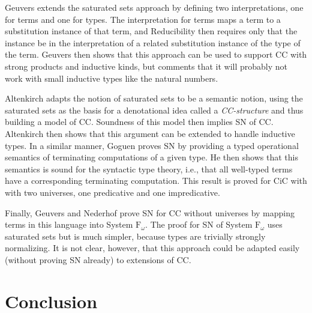 \documentclass{article}
\begin{document}
Geuvers \cite{geuvers94} extends the saturated sets approach by
defining two interpretations, one for terms and one for types.  The
interpretation for terms maps a term to a substitution instance of
that term, and Reducibility then requires only that the instance be in
the interpretation of a related substitution instance of the type of
the term. Geuvers then shows that this approach can be used to support
CC with strong products and inductive kinds, but comments that it will
probably not work with small inductive types like the natural numbers.

Altenkirch \cite{altenkirch93} adapts the notion of saturated sets to
be a semantic notion, using the saturated sets as the basis for a
denotational idea called a \emph{CC-structure} and thus building a
model of CC. Soundness of this model then implies SN of CC. Altenkirch
then shows that this argument can be extended to handle inductive
types.  In a similar manner, Goguen \cite{goguen94} proves SN by
providing a typed operational semantics of terminating computations of
a given type. He then shows that this semantics is sound for the
syntactic type theory, i.e., that all well-typed terms have a
corresponding terminating computation. This result is proved for CiC
with with two universes, one predicative and one impredicative.

Finally, Geuvers and Nederhof \cite{geuvers91} prove SN for CC without
universes by mapping terms in this language into System
$\mathrm{F}_{\omega}$. The proof for SN of System
$\mathrm{F}_{\omega}$ uses saturated sets but is much simpler, because
types are trivially strongly normalizing. It is not clear, however,
that this approach could be adapted easily (without proving SN
already) to extensions of CC.



\section{Conclusion}
\label{sec:conclusion}
\end{document}
